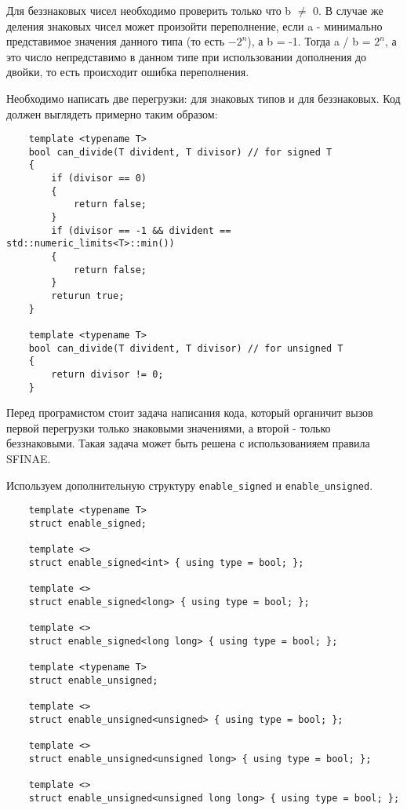 	Для беззнаковых чисел необходимо проверить только что b $\neq$ 0. В случае же деления знаковых чисел может произойти переполнение, если a - минимально представимое значения данного типа (то есть $-2^n$), а b = -1. Тогда a / b = $2^n$, а это число непредставимо в данном типе при использовании дополнения до двойки, то есть происходит ошибка переполнения.
	
	Необходимо написать две перегрузки: для знаковых типов и для беззнаковых. Код должен выглядеть примерно таким образом:
	
	\begin{verbatim}
	template <typename T>
	bool can_divide(T divident, T divisor) // for signed T
	{
		if (divisor == 0)
		{
			return false;
		}
		if (divisor == -1 && divident == std::numeric_limits<T>::min())
		{
			return false;
		}
		returun true;
	}
	
	template <typename T>
	bool can_divide(T divident, T divisor) // for unsigned T
	{
		return divisor != 0;
	}
	\end{verbatim}
	
	Перед програмистом стоит задача написания кода, который органичит вызов первой перегрузки только знаковыми значениями, а второй - только беззнаковыми. Такая задача может быть решена с использованияем правила SFINAE.
	
	Используем дополнительную структуру \texttt{enable_signed} и \texttt{enable_unsigned}. 
	
	\begin{verbatim}
	template <typename T>
	struct enable_signed;
	
	template <> 
	struct enable_signed<int> { using type = bool; };
	
	template <> 
	struct enable_signed<long> { using type = bool; };
	
	template <> 
	struct enable_signed<long long> { using type = bool; };
	
	template <typename T>
	struct enable_unsigned;
	
	template <> 
	struct enable_unsigned<unsigned> { using type = bool; };
	
	template <> 
	struct enable_unsigned<unsigned long> { using type = bool; };
	
	template <>
	struct enable_unsigned<unsigned long long> { using type = bool; };
	\end{verbatim}
	
